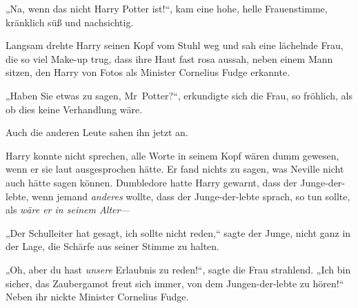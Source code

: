 „Na, wenn das nicht Harry Potter ist!“, kam eine hohe, helle Frauenstimme, kränklich süß und nachsichtig.

Langsam drehte Harry seinen Kopf vom Stuhl weg und sah eine lächelnde Frau, die so viel Make-up trug, dass ihre Haut fast rosa aussah, neben einem Mann sitzen, den Harry von Fotos als Minister Cornelius Fudge erkannte.

„Haben Sie etwas zu sagen, Mr~Potter?“, erkundigte sich die Frau, so fröhlich, als ob dies keine Verhandlung wäre.

Auch die anderen Leute sahen ihn jetzt an.

Harry konnte nicht sprechen, alle Worte in seinem Kopf wären dumm gewesen, wenn er sie laut ausgesprochen hätte. Er fand nichts zu sagen, was Neville nicht auch hätte sagen können. Dumbledore hatte Harry gewarnt, dass der Junge-der-lebte, wenn jemand \emph{anderes} wollte, dass der Junge-der-lebte sprach, so tun sollte, als \emph{wäre er in seinem Alter}—

„Der Schulleiter hat gesagt, ich sollte nicht reden,“ sagte der Junge, nicht ganz in der Lage, die Schärfe aus seiner Stimme zu halten.

„Oh, aber du hast \emph{unsere} Erlaubnis zu reden!“, sagte die Frau strahlend. „Ich bin sicher, das Zaubergamot freut sich immer, von dem Jungen-der-lebte zu hören!“
Neben ihr nickte Minister Cornelius Fudge.

